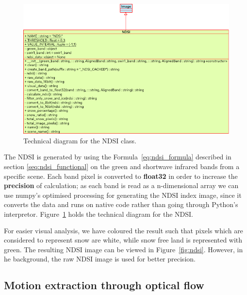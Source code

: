 \documentclass[12pt, a4paper]{report}
\begin{document}
	\begin{figure}[h!]
		\centering
		\includegraphics[scale=0.7]{../images/ndsi_diagram.png}
		\caption{Technical diagram for the NDSI class.}
		\label{fig:ndsi_diagram}
	\end{figure}

	\par The NDSI is generated by using the Formula~\ref{eq:ndsi_formula} described in section \ref{seq:ndsi_functional} on the green and shortwave infrared bands from a specific scene. Each band pixel is converted to \textbf{float32} in order to increase the \textbf{precision} of calculation; as each band is read as a n-dimensional array we can use numpy's optimised processing for generating the NDSI index image, since it converts the data and runs on native code rather than going through Python's interpretor. Figure~\ref{fig:ndsi_diagram} holds the technical diagram for the NDSI.
	
	\par For easier visual analysis, we have coloured the result such that pixels which are considered to represent snow are white, while snow free land is represented with green. The resulting NDSI image can be viewed in Figure~\ref{fig:ndsi}. However, in he background, the raw NDSI image is used for better precision.


	\subsection{Motion extraction through optical flow}
	\label{motion_ndsi_implementation}
	
\end{document}
